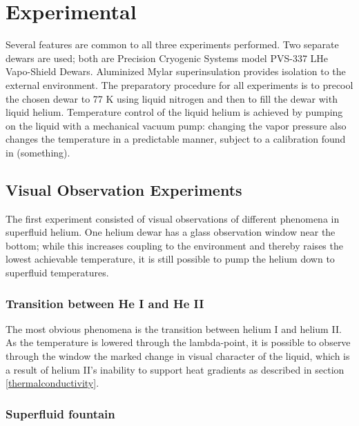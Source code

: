 
\section{Experimental}\label{experimental}

Several features are common to all three experiments performed. Two separate dewars are used; both are Precision Cryogenic Systems model PVS-337 LHe Vapo-Shield Dewars. Aluminized Mylar superinsulation provides isolation to the external environment. The preparatory procedure for all experiments is to precool the chosen dewar to 77 K using liquid nitrogen and then to fill the dewar with liquid helium. Temperature control of the liquid helium is achieved by pumping on the liquid with a mechanical vacuum pump: changing the vapor pressure also changes the temperature in a predictable manner, subject to a calibration found in (something).


\subsection{Visual Observation Experiments}

The first experiment consisted of visual observations of different phenomena in superfluid helium. One helium dewar has a glass observation window near the bottom; while this increases coupling to the environment and thereby raises the lowest achievable temperature, it is still possible to pump the helium down to superfluid temperatures.

\subsubsection{Transition between He I and He II}

The most obvious phenomena is the transition between helium I and helium II. As the temperature is lowered through the lambda-point, it is possible to observe through the window the marked change in visual character of the liquid, which is a result of helium II's inability to support heat gradients as described in section \ref{thermalconductivity}.

\subsubsection{Superfluid fountain}

